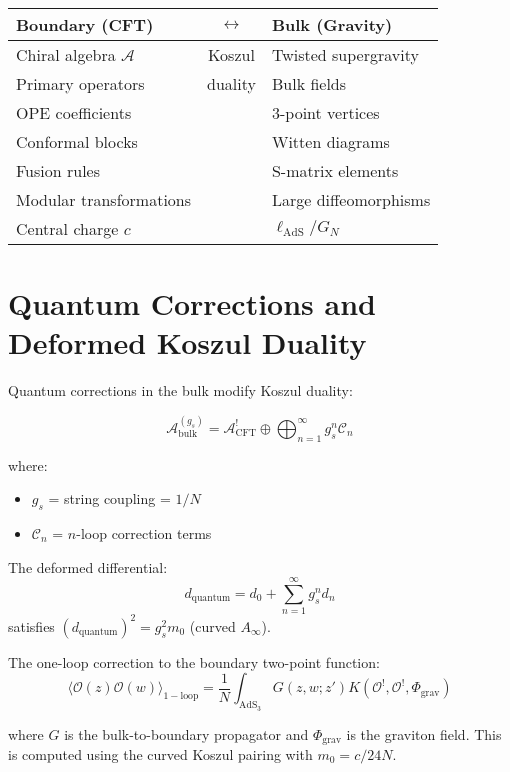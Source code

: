 \begin{corollary}
\begin{center}
\begin{tabular}{|l|c|l|}
\hline
\textbf{Boundary (CFT)} & $\leftrightarrow$ & \textbf{Bulk (Gravity)} \\
\hline
Chiral algebra $\mathcal{A}$ & Koszul & Twisted supergravity \\
Primary operators & duality & Bulk fields \\
OPE coefficients & & 3-point vertices \\
Conformal blocks & & Witten diagrams \\
Fusion rules & & S-matrix elements \\
Modular transformations & & Large diffeomorphisms \\
Central charge $c$ & & $\ell_{\text{AdS}}/G_N$ \\
\hline
\end{tabular}
\end{center}
\end{corollary}

\section{Quantum Corrections and Deformed Koszul Duality}

\begin{theorem}
Quantum corrections in the bulk modify Koszul duality:

$$\mathcal{A}_{\text{bulk}}^{(g_s)} = \mathcal{A}_{\text{CFT}}^! \oplus \bigoplus_{n=1}^\infty g_s^n \mathcal{C}_n$$

where:
\begin{itemize}
\item $g_s$ = string coupling = $1/N$
\item $\mathcal{C}_n$ = $n$-loop correction terms
\end{itemize}

The deformed differential:
$$d_{\text{quantum}} = d_0 + \sum_{n=1}^\infty g_s^n d_n$$
satisfies $(d_{\text{quantum}})^2 = g_s^2 m_0$ (curved $A_\infty$).
\end{theorem}

\begin{example}
The one-loop correction to the boundary two-point function:
$$\langle \mathcal{O}(z) \mathcal{O}(w) \rangle_{1-\text{loop}} = \frac{1}{N} \int_{\text{AdS}_3} G(z,w;z') K(\mathcal{O}^!, \mathcal{O}^!, \Phi_{\text{grav}})$$

where $G$ is the bulk-to-boundary propagator and $\Phi_{\text{grav}}$ is the graviton field.
This is computed using the curved Koszul pairing with $m_0 = c/24N$.
\end{example}

